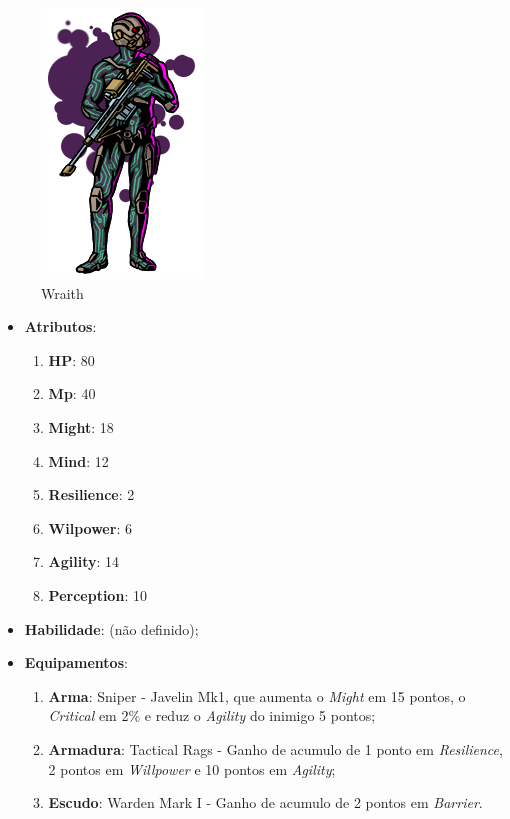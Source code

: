 \documentclass[11pt]{article} %
\begin{document}
\begin{figure}[!htp]
\centering
\includegraphics[scale=0.5]{res/characters/Wraith.png}
\caption{Wraith}
\label{Wraith}
\end{figure}

\begin{itemize}
\item \textbf{Atributos}:
  \begin{enumerate}
    \item \textbf{HP}: 80
    \item \textbf{Mp}: 40
    \item \textbf{Might}: 18
    \item \textbf{Mind}: 12
    \item \textbf{Resilience}: 2
    \item \textbf{Wilpower}: 6
    \item \textbf{Agility}: 14
    \item \textbf{Perception}: 10
  \end{enumerate}
\item \textbf{Habilidade}: (não definido);
\item \textbf{Equipamentos}:
  \begin{enumerate}
    \item \textbf{Arma}: Sniper - Javelin Mk1, que aumenta o \textit{Might} em 15 pontos, o \textit{Critical} em 2\% e reduz o \textit{Agility} do inimigo 5 pontos;
    \item \textbf{Armadura}: Tactical Rags - Ganho de acumulo de 1 ponto em \textit{Resilience}, 2 pontos em \textit{Willpower} e 10 pontos em \textit{Agility};
    \item \textbf{Escudo}: Warden Mark I - Ganho de acumulo de 2 pontos em \textit{Barrier}.
  \end{enumerate}
\end{itemize}
\end{document}
